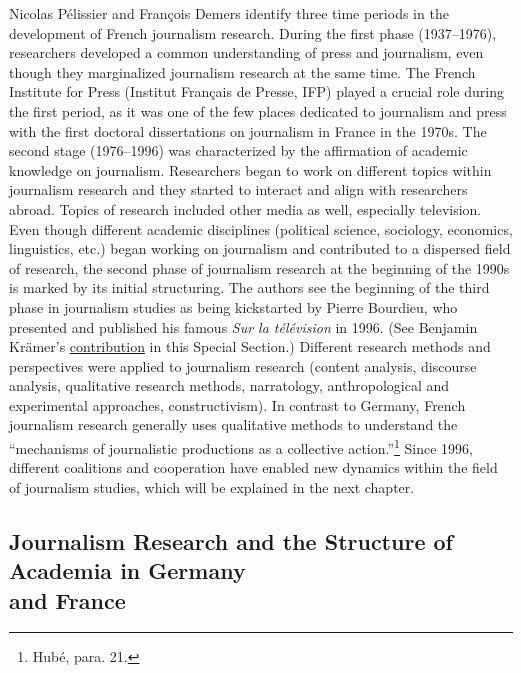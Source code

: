 \documentclass{tufte-handout}
\begin{document}
Nicolas Pélissier and François Demers identify three time periods in the
development of French journalism research. During the first phase
(1937--1976), researchers developed a common understanding of press and
journalism, even though they marginalized journalism research at the
same time. The French Institute for Press (Institut Français de Presse,
IFP) played a crucial role during the first period, as it was one of the
few places dedicated to journalism and press with the first doctoral
dissertations on journalism in France in the 1970s. The second stage
(1976--1996) was characterized by the affirmation of academic knowledge
on journalism. Researchers began to work on different topics within
journalism research and they started to interact and align with
researchers abroad. Topics of research included other media as well,
especially television. Even though different academic disciplines
(political science, sociology, economics, linguistics, etc.) began
working on journalism and contributed to a dispersed field of research,
the second phase of journalism research at the beginning of the 1990s is
marked by its initial structuring. The authors see the beginning of the
third phase in journalism studies as being kickstarted by Pierre
Bourdieu, who presented and published his famous \emph{Sur la
télévision} in 1996. (See Benjamin Krämer's
\href{https://hms.mediastudies.press/pub/kramer-bourdieu/}{contribution}
in this Special Section.) Different research methods and perspectives
were applied to journalism research (content analysis, discourse
analysis, qualitative research methods, narratology, anthropological and
experimental approaches, constructivism). In contrast to Germany, French
journalism research generally uses qualitative methods to understand the
``mechanisms of journalistic productions as a collective
action.''\footnote{Hubé, para. 21.} Since 1996, different coalitions and
cooperation have enabled new dynamics within the field of journalism
studies, which will be explained in the next chapter.

\hypertarget{journalism-research-and-the-structure-of-academia-in-germany-and-france}{%
\subsection{Journalism Research and the
Structure of Academia in Germany\\\noindent and
France}\label{journalism-research-and-the-structure-of-academia-in-germany-and-france}}
\end{document}
